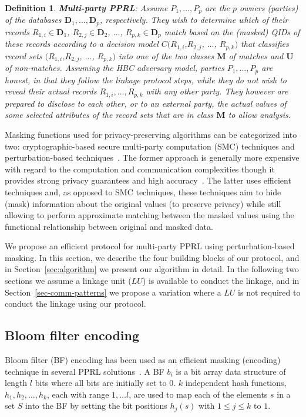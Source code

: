 \documentclass{sig-alternate}
\newtheorem{defi}{Definition}[section]
\begin{document}
\begin{defi}
\textbf{Multi-party PPRL}: 
Assume $P_{1}, \ldots, P_{p}$ are the $p$ owners (parties) of the databases $\mathbf{D}_{1}, \ldots, \mathbf{D}_{p}$, respectively. They wish to determine which of their records $R_{1,i} \in \mathbf{D}_{1}$, $R_{2,j} \in \mathbf{D}_{2}$, $ \ldots$,  $R_{p,k} \in \mathbf{D}_{p}$ match based on the (masked) QIDs of these records according to a decision model $C(R_{1,i}$,$R_{2,j}$, $\ldots$, $R_{p,k})$ that classifies record sets $(R_{1,i}$,$R_{2,j}$, $\ldots$, $R_{p,k})$ into one of the two classes $\mathbf{M}$ of matches and $\mathbf{U}$ of non-matches. Assuming the HBC adversary model, parties $P_{1}, \ldots, P_{p}$ are honest, in that they follow the linkage protocol steps, while they do not wish to reveal their actual records ${R}_{1,i}, \ldots, {R}_{p,k}$ with any other party. They however are prepared to disclose to each other, or to an external party, the actual values of some selected attributes of the record sets that are in class $\mathbf{M}$ to allow analysis. 
\end{defi}

Masking functions used for privacy-preserving algorithms can be 
categorized into two: cryptographic-based secure multi-party computation (SMC)
techniques and perturbation-based techniques~\cite{Vat14}.
The former approach is generally more expensive
with regard to the computation and communication complexities
though it provides strong privacy guarantees and high accuracy~\cite{Lin00}. 
The latter uses efficient techniques and, as opposed to SMC techniques, 
these techniques aim to hide (mask) information about the original
values (to preserve privacy) 
while still allowing to perform approximate matching between the
masked values using the functional relationship between original
and masked data.

We propose an efficient protocol for multi-party PPRL 
using perturbation-based masking.
In this section, we describe the four building blocks of our protocol, 
and in Section~\ref{sec:algorithm} we present our algorithm in detail.
In the following two sections we assume a linkage unit
($LU$) is available to conduct the linkage, 
and in Section~\ref{sec-comm-patterns} we propose a variation where
a $LU$ is not required to conduct the linkage using our protocol.


\subsection{Bloom filter encoding}
\label{subsec-bf}
Bloom filter (BF) encoding has been used as an efficient masking (encoding) technique
in several PPRL solutions~\cite{Dur13,Lai06,Ran14,Sch11,Seh15,Vat12,Vat14c,Vat16c}.
A BF $b_i$ is a bit array data structure of length $l$ bits
where all bits are initially set to $0$. $k$ independent hash
functions, $h_1,h_2, \ldots, h_k$, each with range $1, \ldots l$, are
used to map each of the elements $s$ in a set $S$ into the BF by
setting the bit positions $h_j(s)$ with $1 \le j \le k$ to $1$. 
\end{document}
